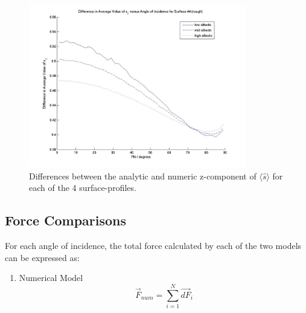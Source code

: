 \begin{description}
\begin{figure}[!ht]
        \includegraphics[width=95mm]{figs/sda/unit_vec_diff__z__rough.jpg}
        \caption{Differences between the analytic and numeric z-component of
                 $\langle \hat{s}\rangle$ for each of the 4
                 surface-profiles.}
        \label{fig:ivv_sda_s_vector_diffs_z}
      \end{figure}

      \clearpage

     \subsection{Force Comparisons}
      For each angle of incidence, the total force calculated by
      each of the two models can be expressed as:
      \begin{enumerate}
        \item{}Numerical Model
          \begin{equation}
            {\vec{F}}_{\mathit{num}}=\sum _{i=1}^{N}\vec{\mathit{dF}}_{i}
            \label{eqn:ivv_fvi_force_numerical}
          \end{equation}


\end{enumerate}
\end{description}
